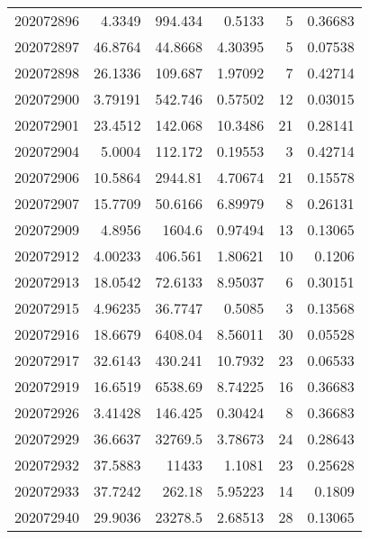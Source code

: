 \begin{tabular}{rrrrrr}
 202072896 &          4.3349  &      994.434  &            0.5133  &           5 & 0.36683 \\
 202072897 &         46.8764  &       44.8668 &            4.30395 &           5 & 0.07538 \\
 202072898 &         26.1336  &      109.687  &            1.97092 &           7 & 0.42714 \\
 202072900 &          3.79191 &      542.746  &            0.57502 &          12 & 0.03015 \\
 202072901 &         23.4512  &      142.068  &           10.3486  &          21 & 0.28141 \\
 202072904 &          5.0004  &      112.172  &            0.19553 &           3 & 0.42714 \\
 202072906 &         10.5864  &     2944.81   &            4.70674 &          21 & 0.15578 \\
 202072907 &         15.7709  &       50.6166 &            6.89979 &           8 & 0.26131 \\
 202072909 &          4.8956  &     1604.6    &            0.97494 &          13 & 0.13065 \\
 202072912 &          4.00233 &      406.561  &            1.80621 &          10 & 0.1206  \\
 202072913 &         18.0542  &       72.6133 &            8.95037 &           6 & 0.30151 \\
 202072915 &          4.96235 &       36.7747 &            0.5085  &           3 & 0.13568 \\
 202072916 &         18.6679  &     6408.04   &            8.56011 &          30 & 0.05528 \\
 202072917 &         32.6143  &      430.241  &           10.7932  &          23 & 0.06533 \\
 202072919 &         16.6519  &     6538.69   &            8.74225 &          16 & 0.36683 \\
 202072926 &          3.41428 &      146.425  &            0.30424 &           8 & 0.36683 \\
 202072929 &         36.6637  &    32769.5    &            3.78673 &          24 & 0.28643 \\
 202072932 &         37.5883  &    11433      &            1.1081  &          23 & 0.25628 \\
 202072933 &         37.7242  &      262.18   &            5.95223 &          14 & 0.1809  \\
 202072940 &         29.9036  &    23278.5    &            2.68513 &          28 & 0.13065 \\

\end{tabular}
